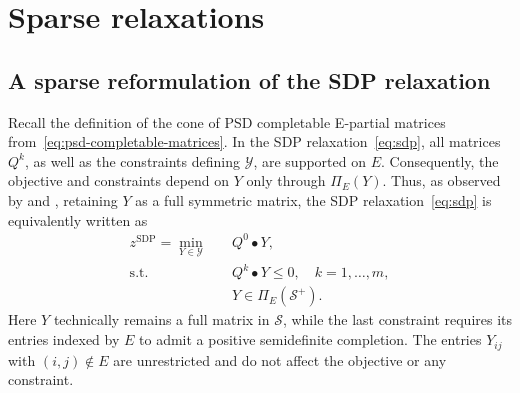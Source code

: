\documentclass[twoside]{article}
\newcommand{\citet}[1]{\cite{#1}}
\begin{document}
	
	
	\section{Sparse relaxations}
	\label{sec:sparse-rel}
	
	\subsection{A sparse reformulation of the SDP relaxation}\label{sec:sparsesdp}
	
	
	Recall the definition of the cone of PSD completable E-partial matrices from~\eqref{eq:psd-completable-matrices}.
	In the SDP relaxation~\eqref{eq:sdp}, all matrices $Q^k$, as well as the constraints defining $\mathcal Y$, are supported on $E$.
	Consequently, the objective and constraints depend on $Y$ only through $\Pi_E(Y)$.  
	Thus, as observed by \citet{fukudaetal2001} and \citet{burer2003}, retaining $Y$ as a full symmetric matrix, the SDP relaxation~\eqref{eq:sdp} is equivalently written as
	\begin{subequations}\label{eq:sdp-projected}
		\begin{align}
			z^{\mathrm{SDP}}
			= \min_{Y\in\mathcal Y}\quad
			& Q^0\bullet Y,\\
			\text{s.t.}\quad
			& Q^k\bullet Y\leq 0,
			\quad k=1,\ldots,m,\\
			& Y \in\Pi_E(\mathcal S^+).
		\end{align}
	\end{subequations}
	Here $Y$ technically remains a full matrix in $\mathcal S$, while the last
	constraint requires its entries indexed by $E$ to admit a positive
	semidefinite completion. The entries $Y_{ij}$ with $(i,j)\notin E$
	are unrestricted and do not affect the objective or any constraint.
	
\end{document}
